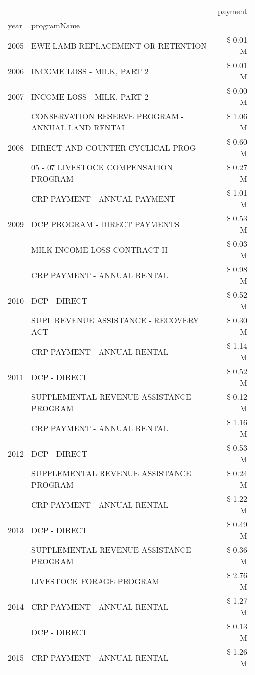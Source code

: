 \begin{tabular}{llr}
\toprule
 &  & payment \\
year & programName &  \\
\midrule
2005 & EWE LAMB REPLACEMENT OR RETENTION & \$ 0.01 M \\
\cline{1-3}
2006 & INCOME LOSS - MILK, PART 2 & \$ 0.01 M \\
\cline{1-3}
2007 & INCOME LOSS - MILK, PART 2 & \$ 0.00 M \\
\cline{1-3}
\multirow[t]{3}{*}{2008} & CONSERVATION RESERVE PROGRAM - ANNUAL LAND RENTAL & \$ 1.06 M \\
 & DIRECT AND COUNTER CYCLICAL PROG & \$ 0.60 M \\
 & 05 - 07 LIVESTOCK COMPENSATION PROGRAM & \$ 0.27 M \\
\cline{1-3}
\multirow[t]{3}{*}{2009} & CRP PAYMENT - ANNUAL PAYMENT & \$ 1.01 M \\
 & DCP PROGRAM - DIRECT PAYMENTS & \$ 0.53 M \\
 & MILK INCOME LOSS CONTRACT II & \$ 0.03 M \\
\cline{1-3}
\multirow[t]{3}{*}{2010} & CRP PAYMENT - ANNUAL RENTAL & \$ 0.98 M \\
 & DCP - DIRECT & \$ 0.52 M \\
 & SUPL REVENUE ASSISTANCE - RECOVERY ACT & \$ 0.30 M \\
\cline{1-3}
\multirow[t]{3}{*}{2011} & CRP PAYMENT - ANNUAL RENTAL & \$ 1.14 M \\
 & DCP - DIRECT & \$ 0.52 M \\
 & SUPPLEMENTAL REVENUE ASSISTANCE PROGRAM & \$ 0.12 M \\
\cline{1-3}
\multirow[t]{3}{*}{2012} & CRP PAYMENT - ANNUAL RENTAL & \$ 1.16 M \\
 & DCP - DIRECT & \$ 0.53 M \\
 & SUPPLEMENTAL REVENUE ASSISTANCE PROGRAM & \$ 0.24 M \\
\cline{1-3}
\multirow[t]{3}{*}{2013} & CRP PAYMENT - ANNUAL RENTAL & \$ 1.22 M \\
 & DCP - DIRECT & \$ 0.49 M \\
 & SUPPLEMENTAL REVENUE ASSISTANCE PROGRAM & \$ 0.36 M \\
\cline{1-3}
\multirow[t]{3}{*}{2014} & LIVESTOCK FORAGE PROGRAM & \$ 2.76 M \\
 & CRP PAYMENT - ANNUAL RENTAL & \$ 1.27 M \\
 & DCP - DIRECT & \$ 0.13 M \\
\cline{1-3}
\multirow[t]{3}{*}{2015} & CRP PAYMENT - ANNUAL RENTAL & \$ 1.26 M \\

\end{tabular}
